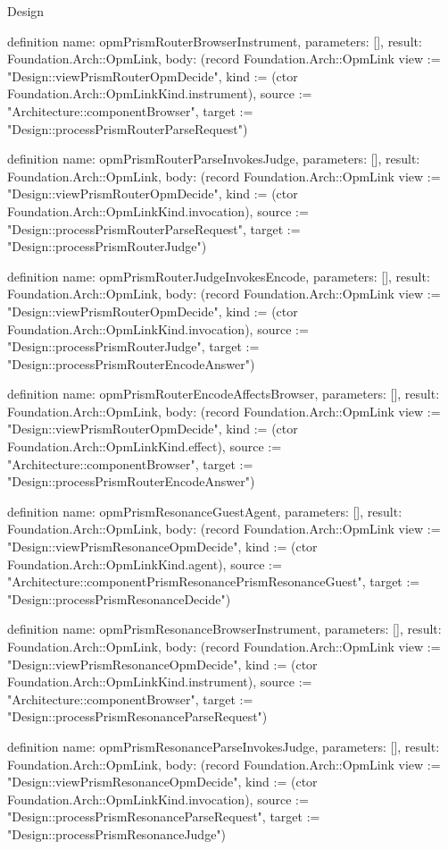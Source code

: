 \begin{lexlean}{Design}
\begin{semanticmodule}
definition{
  name: opmPrismRouterBrowserInstrument,
  parameters: [],
  result: Foundation.Arch::OpmLink,
  body: (record Foundation.Arch::OpmLink {view := "Design::viewPrismRouterOpmDecide", kind := (ctor Foundation.Arch::OpmLinkKind.instrument), source := "Architecture::componentBrowser", target := "Design::processPrismRouterParseRequest"})
}

definition{
  name: opmPrismRouterParseInvokesJudge,
  parameters: [],
  result: Foundation.Arch::OpmLink,
  body: (record Foundation.Arch::OpmLink {view := "Design::viewPrismRouterOpmDecide", kind := (ctor Foundation.Arch::OpmLinkKind.invocation), source := "Design::processPrismRouterParseRequest", target := "Design::processPrismRouterJudge"})
}

definition{
  name: opmPrismRouterJudgeInvokesEncode,
  parameters: [],
  result: Foundation.Arch::OpmLink,
  body: (record Foundation.Arch::OpmLink {view := "Design::viewPrismRouterOpmDecide", kind := (ctor Foundation.Arch::OpmLinkKind.invocation), source := "Design::processPrismRouterJudge", target := "Design::processPrismRouterEncodeAnswer"})
}

definition{
  name: opmPrismRouterEncodeAffectsBrowser,
  parameters: [],
  result: Foundation.Arch::OpmLink,
  body: (record Foundation.Arch::OpmLink {view := "Design::viewPrismRouterOpmDecide", kind := (ctor Foundation.Arch::OpmLinkKind.effect), source := "Architecture::componentBrowser", target := "Design::processPrismRouterEncodeAnswer"})
}

definition{
  name: opmPrismResonanceGuestAgent,
  parameters: [],
  result: Foundation.Arch::OpmLink,
  body: (record Foundation.Arch::OpmLink {view := "Design::viewPrismResonanceOpmDecide", kind := (ctor Foundation.Arch::OpmLinkKind.agent), source := "Architecture::componentPrismResonancePrismResonanceGuest", target := "Design::processPrismResonanceDecide"})
}

definition{
  name: opmPrismResonanceBrowserInstrument,
  parameters: [],
  result: Foundation.Arch::OpmLink,
  body: (record Foundation.Arch::OpmLink {view := "Design::viewPrismResonanceOpmDecide", kind := (ctor Foundation.Arch::OpmLinkKind.instrument), source := "Architecture::componentBrowser", target := "Design::processPrismResonanceParseRequest"})
}

definition{
  name: opmPrismResonanceParseInvokesJudge,
  parameters: [],
  result: Foundation.Arch::OpmLink,
  body: (record Foundation.Arch::OpmLink {view := "Design::viewPrismResonanceOpmDecide", kind := (ctor Foundation.Arch::OpmLinkKind.invocation), source := "Design::processPrismResonanceParseRequest", target := "Design::processPrismResonanceJudge"})
}


\end{semanticmodule}
\end{lexlean}
